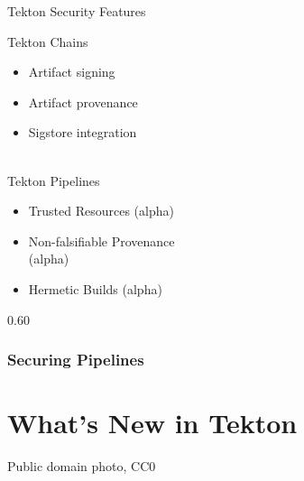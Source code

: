 \documentclass[aspectratio=169,11pt,hyperref={colorlinks=true}]{beamer}
\begin{document}
\begin{lpicwhiterblack}{%
  Tekton Security Features
  }%
  {%
  Tekton Chains
  \begin{itemize}
    \item Artifact signing
    \item Artifact provenance
    \item Sigstore integration
  \end{itemize}
  ~\\
  Tekton Pipelines
  \begin{itemize}
    \item Trusted Resources (alpha)
    \item Non-falsifiable Provenance \\(alpha)
    \item Hermetic Builds (alpha)
  \end{itemize}
  }%
  {0.60}
  \frametitle{Securing Pipelines}
\end{lpicwhiterblack}

\section[What's New]{What's New in Tekton}
\begin{sectionwithpic}{Public domain photo, CC0}
\end{sectionwithpic}
\end{document}
